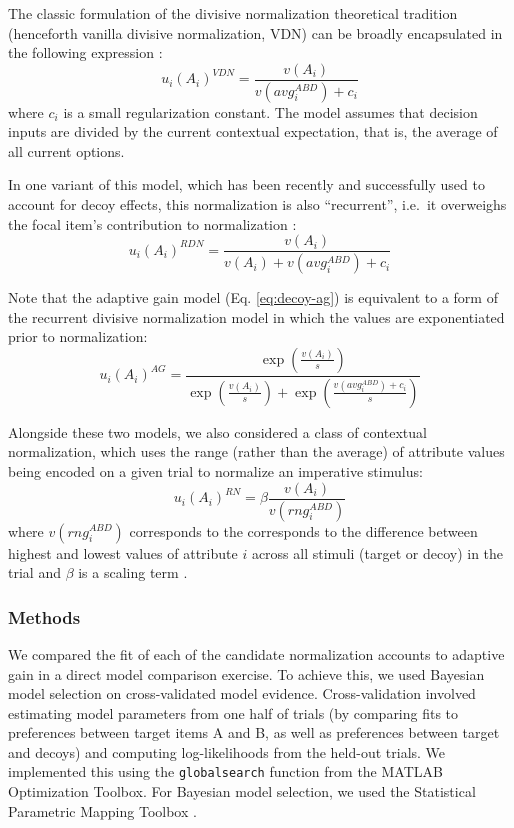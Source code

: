 \documentclass[a4paper, nobind]{templates/ociamthesis}
\begin{document}
The classic formulation of the divisive normalization theoretical tradition (henceforth vanilla divisive normalization, VDN) can be broadly encapsulated in the following expression \autocite{carandini2012,louie2013}:
\begin{equation}
u_i(A_i)^{VDN} = \frac{v(A_i)}{v(avg_i^{ABD})+c_i}
\label{eq:decoy-vdn}
\end{equation}
where \(c_i\) is a small regularization constant. The model assumes that decision inputs are divided by the current contextual expectation, that is, the average of all current options.

In one variant of this model, which has been recently and successfully used to account for decoy effects, this normalization is also ``recurrent'', i.e.~it overweighs the focal item's contribution to normalization \autocite{daviet2018,webb2021}:
\begin{equation}
u_i(A_i)^{RDN} = \frac{v(A_i)}{v(A_i)+v(avg_i^{ABD})+c_i}
\label{eq:decoy-rdn}
\end{equation}

Note that the adaptive gain model (Eq. \eqref{eq:decoy-ag}) is equivalent to a form of the recurrent divisive normalization model in which the values are exponentiated prior to normalization:
\begin{equation}
u_i(A_i)^{AG} = \frac{\exp(\frac{v(A_i)}{s})}{\exp(\frac{v(A_i)}{s})+\exp(\frac{v(avg_i^{ABD})+c_i}{s})}
\label{eq:decoy-rdn}
\end{equation}

Alongside these two models, we also considered a class of contextual normalization, which uses the range (rather than the average) of attribute values being encoded on a given trial to normalize an imperative stimulus:
\begin{equation}
u_i(A_i)^{RN} = \beta \frac{v(A_i)}{v(rng_i^{ABD})}
\label{eq:decoy-rn}
\end{equation}
where \(v(rng_i^{ABD})\) corresponds to the corresponds to the difference between highest and lowest values of attribute \(i\) across all stimuli (target or decoy) in the trial and \(\beta\) is a scaling term \autocite{soltani2012,bushong2021}.

\hypertarget{methods-1}{%
\subsubsection{Methods}\label{methods-1}}

We compared the fit of each of the candidate normalization accounts to adaptive gain in a direct model comparison exercise. To achieve this, we used Bayesian model selection on cross-validated model evidence. Cross-validation involved estimating model parameters from one half of trials (by comparing fits to preferences between target items A and B, as well as preferences between target and decoys) and computing log-likelihoods from the held-out trials. We implemented this using the \texttt{globalsearch} function from the MATLAB Optimization Toolbox. For Bayesian model selection, we used the Statistical Parametric Mapping Toolbox \autocite{stephan2009}.
\end{document}
